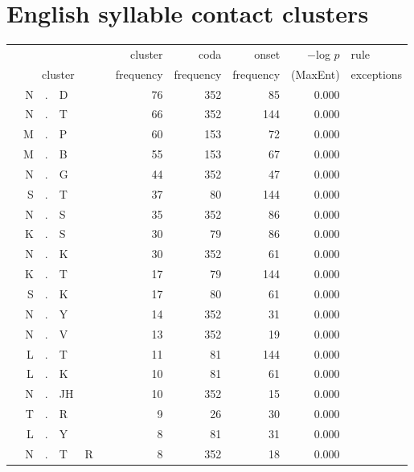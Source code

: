 \chapter{English syllable contact clusters} \label{appendixB}

\begin{longtable}{r@{ } r@{ } c@{ } l@{ } l@{ } l@{ } r r r r l }
\toprule
 &  &  &  &  &  &  cluster  &  coda  &  onset  &  $-$log $p$  &  rule \\
\multicolumn{6}{c}{cluster}  &  frequency  &  frequency  &  frequency  &  (MaxEnt)  &  exceptions\\ 
\midrule
  & N & . & D &   &   & 76 & 352 & 85 & 0.000 &  \\
  & N & . & T &   &   & 66 & 352 & 144 & 0.000 &  \\
  & M & . & P &   &   & 60 & 153 & 72 & 0.000 &  \\
  & M & . & B &   &   & 55 & 153 & 67 & 0.000 &  \\
  & N & . & G &   &   & 44 & 352 & 47 & 0.000 &  \\
  & S & . & T &   &   & 37 & 80 & 144 & 0.000 &  \\
  & N & . & S &   &   & 35 & 352 & 86 & 0.000 &  \\
  & K & . & S &   &   & 30 & 79 & 86 & 0.000 &  \\
  & N & . & K &   &   & 30 & 352 & 61 & 0.000 &  \\
  & K & . & T &   &   & 17 & 79 & 144 & 0.000 &  \\
  & S & . & K &   &   & 17 & 80 & 61 & 0.000 &  \\
  & N & . & Y &   &   & 14 & 352 & 31 & 0.000 &  \\
  & N & . & V &   &   & 13 & 352 & 19 & 0.000 &  \\
  & L & . & T &   &   & 11 & 81 & 144 & 0.000 &  \\
  & L & . & K &   &   & 10 & 81 & 61 & 0.000 &  \\
  & N & . & JH &   &   & 10 & 352 & 15 & 0.000 &  \\
  & T & . & R &   &   & 9 & 26 & 30 & 0.000 &  \\
  & L & . & Y &   &   & 8 & 81 & 31 & 0.000 &  \\
  & N & . & T & R &   & 8 & 352 & 18 & 0.000 &  \\

\end{longtable}
